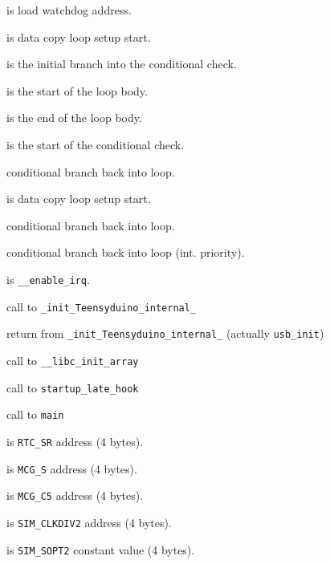  is load watchdog address.

\vspace{1em}

 is data copy loop setup start.

 is the initial branch into the conditional check.

 is the start of the loop body.

 is the end of the loop body.

 is the start of the conditional check.

 conditional branch back into loop.

\vspace{1em}

 is data copy loop setup start.

 conditional branch back into loop.

\vspace{1em}

 conditional branch back into loop (int. priority).

\vspace{1em}

 is \texttt{\_\_enable\_irq}.

 call to \texttt{\_init\_Teensyduino\_internal\_}

 return from \texttt{\_init\_Teensyduino\_internal\_} (actually \texttt{usb\_init})

 call to \texttt{\_\_libc\_init\_array}

 call to \texttt{startup\_late\_hook}

 call to \texttt{main}

\vspace{1em}

 is \texttt{RTC\_SR} address (4 bytes).

 is \texttt{MCG\_S} address (4 bytes).

 is \texttt{MCG\_C5} address (4 bytes).

 is \texttt{SIM\_CLKDIV2} address (4 bytes).

 is \texttt{SIM\_SOPT2} constant value (4 bytes).

